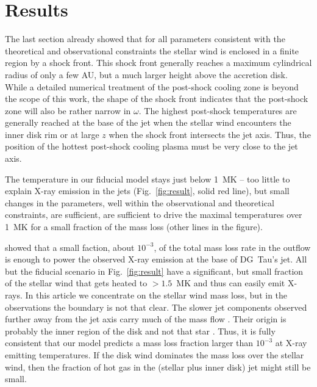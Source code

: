 \section{Results}
\label{sect:results}
The last section already showed that for all parameters consistent with the theoretical and observational constraints the stellar wind is enclosed in a finite region by a shock front. This shock front generally reaches a maximum cylindrical radius of only a few AU, but a much larger height above the accretion disk. While a detailed numerical treatment of the post-shock cooling zone is beyond the scope of this work, the shape of the shock front indicates that the post-shock zone will also be rather narrow in $\omega$. The highest post-shock temperatures are generally reached at the base of the jet when the stellar wind encounters the inner disk rim or at large $z$ when the shock front intersects the jet axis. Thus, the position of the hottest post-shock cooling plasma must be very close to the jet axis. 

The temperature in our fiducial model stays just below 1~MK -- too little to explain X-ray emission in the jets (Fig.~\ref{fig:result}, solid red line), but small changes in the parameters, well within the observational and theoretical constraints,  are sufficient, are sufficient to drive the maximal temperatures over 1~MK for a small fraction of the mass loss (other lines in the figure). 

\citet{2009A&A...493..579G} showed that a small faction, about $10^{-3}$, of the total mass loss rate in the outflow is enough to power the observed X-ray emission at the base of DG~Tau's jet. All but the fiducial scenario in Fig.~\ref{fig:result} have a significant, but small fraction of the stellar wind that gets heated to $>1.5$~MK and thus can easily emit X-rays. In this article we concentrate on the stellar wind mass loss, but in the observations the boundary is not that clear. The slower jet components observed further away from the jet axis carry much of the mass flow \citep{2000ApJ...537L..49B}. Their origin is probably the inner region of the disk and not that star \citep{2003ApJ...590L.107A}. Thus, it is fully consistent that our model predicts a mass loss fraction larger than  $10^{-3}$ at X-ray emitting temperatures. If the disk wind dominates the mass loss over the stellar wind, then the fraction of hot gas in the (stellar plus inner disk) jet might still be small.